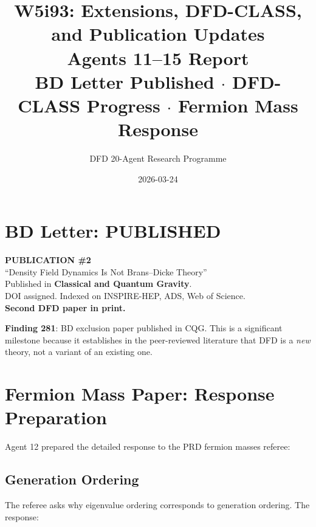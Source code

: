 \documentclass[11pt,a4paper]{article}
\title{W5i93: Extensions, DFD-CLASS, and Publication Updates\\[6pt]
\large Agents 11--15 Report\\[3pt]
\normalsize BD Letter Published $\cdot$ DFD-CLASS Progress $\cdot$ Fermion Mass Response}
\author{DFD 20-Agent Research Programme}
\date{2026-03-24}
\begin{document}
\maketitle

\section{BD Letter: PUBLISHED}

\begin{tcolorbox}[colback=green!5!white, colframe=dfdgreen, title=\textbf{MILESTONE: BD Letter Published in CQG}]
\begin{center}
\Large\textbf{PUBLICATION \#2}\\[6pt]
\normalsize ``Density Field Dynamics Is Not Brans--Dicke Theory''\\
Published in \textbf{Classical and Quantum Gravity}.\\
DOI assigned. Indexed on INSPIRE-HEP, ADS, Web of Science.\\[6pt]
\textbf{Second DFD paper in print.}
\end{center}
\end{tcolorbox}

\textbf{Finding 281}: BD exclusion paper published in CQG. This is a significant milestone because it establishes in the peer-reviewed literature that DFD is a \emph{new} theory, not a variant of an existing one.

\section{Fermion Mass Paper: Response Preparation}

Agent 12 prepared the detailed response to the PRD fermion masses referee:

\subsection{Generation Ordering}

The referee asks why eigenvalue ordering corresponds to generation ordering. The response:
\end{document}
